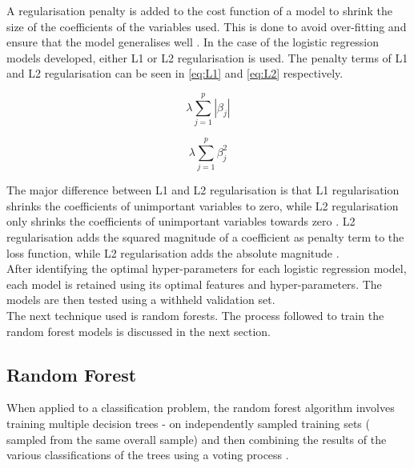 A regularisation penalty is added to the cost function of a model to shrink the size of the coefficients of the variables used. This is done to avoid over-fitting and ensure that the model generalises well \parencite{Regularisation}. In the case of the logistic regression models developed, either L1 or L2 regularisation is used. The penalty terms of L1 and L2 regularisation can be seen in \ref{eq:L1} and \ref{eq:L2} respectively. \\

\vspace{10pt}

\begin{equation} \label{eq:L1}
\lambda\sum_{j=1}^{p}|\beta_{j}|
\end{equation}

\vspace{10pt}

\begin{equation} \label{eq:L2}
\lambda\sum_{j=1}^{p}\beta_{j}^{2}
\end{equation}

\vspace{10pt}

The major difference between L1 and L2 regularisation is that L1 regularisation shrinks the coefficients of unimportant variables to zero, while L2 regularisation only shrinks the coefficients of unimportant variables towards zero \parencite{Hastie}. L2 regularisation adds the squared magnitude of a coefficient as penalty term to the loss function, while L2 regularisation adds the absolute magnitude \parencite{Hastie}. \\

After identifying the optimal hyper-parameters for each logistic regression model, each model is retained using its optimal features and hyper-parameters. The models are then tested using a withheld validation set. \\

The next technique used is random forests. The process followed to train the random forest models is discussed in the next section. 

\subsection{Random Forest}

When applied to a classification problem, the random forest algorithm involves training multiple decision trees - on independently sampled training sets ( sampled from the same overall sample) and then combining the results of the various classifications of the trees using a voting process \parencite{RandomForest}. \\

